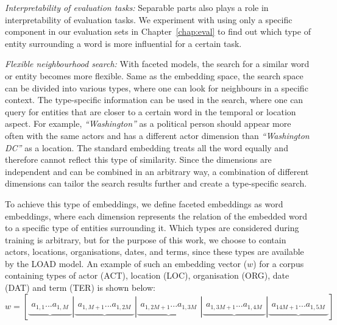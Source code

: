 \begin{compactitem}
\item \emph{Interpretability of evaluation tasks:} Separable parts also plays a role in interpretability of evaluation tasks. We experiment with using only a specific component in our evaluation sets in Chapter~\ref{chap:eval} to find out which type of entity surrounding a word is more influential for a certain task.\\

\item \emph{Flexible neighbourhood search:} With faceted models, the search for a similar word or entity becomes more flexible. Same as the embedding space, the search space can be divided into various types, where one can look for neighbours in a specific context. The type-specific information can be used in the search, where one can query for entities that are closer to a certain word in the temporal or location aspect. For example, \emph{``Washington''} as a political person should appear more often with the same actors and has a different actor dimension than \emph{``Washington DC''} as a location. The standard embedding treats all the word equally and therefore cannot reflect this type of similarity. Since the dimensions are independent and can be combined in an arbitrary way, a combination of different dimensions can tailor the search results further and create a type-specific search. 
\end{compactitem}
To achieve this type of embeddings, we define faceted embeddings as word embeddings, where each dimension represents the relation of the embedded word to a specific type of entities surrounding it. Which types are considered during training is arbitrary, but for the purpose of this work, we choose to contain actors, locations, organisations, dates, and terms, since these types are available by the LOAD model. An example of such an embedding vector ($w$) for a corpus containing types of actor (ACT), location (LOC), organisation (ORG), date (DAT) and term (TER) is shown below: \\
\mathleft
\begin{equation}
w=\left[ \underbrace { \begin{matrix}{ a }_{ 1,1 } ... { a }_{ 1,M } \end{matrix} } |\underbrace { \begin{matrix}{ a }_{ 1,M+1 } ... { a }_{ 1,2M } \end{matrix} } |\underbrace { \begin{matrix}{ a }_{ 1,2M+1 } ... { a }_{ 1,3M } \end{matrix} } |\underbrace { \begin{matrix}{ a }_{ 1,3M+1 } ... { a }_{ 1,4M } \end{matrix} } |\underbrace { \begin{matrix}{ a }_{ 14M+1 } ... { a }_{ 1,5M } \end{matrix} }  \right] 
\label{eq:concat_vec}
\end{equation}
